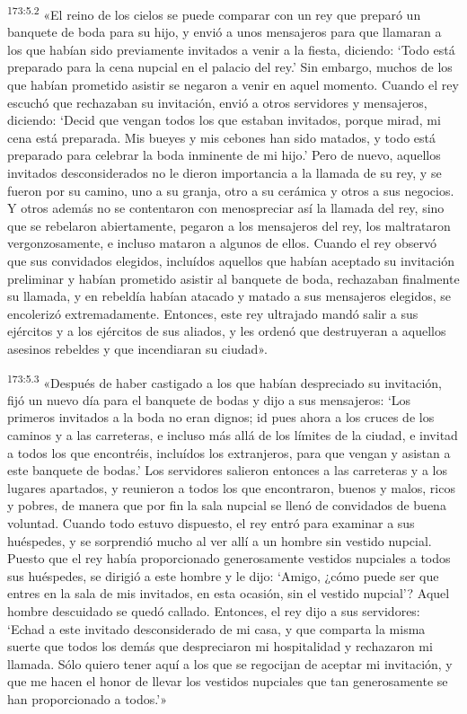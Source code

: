 \par 
\textsuperscript{173:5.2} «El reino de los cielos se puede comparar con un rey que preparó un banquete de boda para su hijo, y envió a unos mensajeros para que llamaran a los que habían sido previamente invitados a venir a la fiesta, diciendo: `Todo está preparado para la cena nupcial en el palacio del rey.' Sin embargo, muchos de los que habían prometido asistir se negaron a venir en aquel momento. Cuando el rey escuchó que rechazaban su invitación, envió a otros servidores y mensajeros, diciendo: `Decid que vengan todos los que estaban invitados, porque mirad, mi cena está preparada. Mis bueyes y mis cebones han sido matados, y todo está preparado para celebrar la boda inminente de mi hijo.' Pero de nuevo, aquellos invitados desconsiderados no le dieron importancia a la llamada de su rey, y se fueron por su camino, uno a su granja, otro a su cerámica y otros a sus negocios. Y otros además no se contentaron con menospreciar así la llamada del rey, sino que se rebelaron abiertamente, pegaron a los mensajeros del rey, los maltrataron vergonzosamente, e incluso mataron a algunos de ellos. Cuando el rey observó que sus convidados elegidos, incluídos aquellos que habían aceptado su invitación preliminar y habían prometido asistir al banquete de boda, rechazaban finalmente su llamada, y en rebeldía habían atacado y matado a sus mensajeros elegidos, se encolerizó extremadamente. Entonces, este rey ultrajado mandó salir a sus ejércitos y a los ejércitos de sus aliados, y les ordenó que destruyeran a aquellos asesinos rebeldes y que incendiaran su ciudad».

\par 
\textsuperscript{173:5.3} «Después de haber castigado a los que habían despreciado su invitación, fijó un nuevo día para el banquete de bodas y dijo a sus mensajeros: `Los primeros invitados a la boda no eran dignos; id pues ahora a los cruces de los caminos y a las carreteras, e incluso más allá de los límites de la ciudad, e invitad a todos los que encontréis, incluídos los extranjeros, para que vengan y asistan a este banquete de bodas.' Los servidores salieron entonces a las carreteras y a los lugares apartados, y reunieron a todos los que encontraron, buenos y malos, ricos y pobres, de manera que por fin la sala nupcial se llenó de convidados de buena voluntad. Cuando todo estuvo dispuesto, el rey entró para examinar a sus huéspedes, y se sorprendió mucho al ver allí a un hombre sin vestido nupcial. Puesto que el rey había proporcionado generosamente vestidos nupciales a todos sus huéspedes, se dirigió a este hombre y le dijo: `Amigo, ¿cómo puede ser que entres en la sala de mis invitados, en esta ocasión, sin el vestido nupcial'? Aquel hombre descuidado se quedó callado. Entonces, el rey dijo a sus servidores: `Echad a este invitado desconsiderado de mi casa, y que comparta la misma suerte que todos los demás que despreciaron mi hospitalidad y rechazaron mi llamada. Sólo quiero tener aquí a los que se regocijan de aceptar mi invitación, y que me hacen el honor de llevar los vestidos nupciales que tan generosamente se han proporcionado a todos.'»

